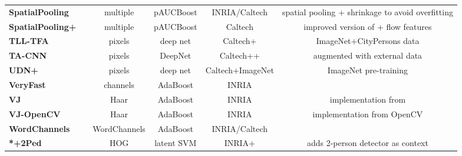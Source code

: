 \documentclass[onecolumn]{article}
\begin{document}
\begin{table}[!h]
\begin{tabular}{@{}l@{\cp}c|c@{\cp}c@{\cp}c|c@{}}
  \textbf{SpatialPooling} & \cite{PaisitkriangkraiECCV14} & multiple & pAUCBoost & INRIA/Caltech &
   spatial pooling + shrinkage to avoid overfitting\\
  \textbf{SpatialPooling+} & \cite{PaisitkriangkraiArXiv14} & multiple & pAUCBoost & Caltech &
   improved version of \cite{PaisitkriangkraiICCV13,PaisitkriangkraiECCV14} + flow features\\
  \textbf{TLL-TFA} & \cite{SongECCV18} & pixels & deep net & Caltech+ &
   ImageNet+CityPersons data \\
  \textbf{TA-CNN} & \cite{TianCVPR2015} & pixels & DeepNet & Caltech++ & 
   augmented with external data\\
  \textbf{UDN+} & \cite{OuyangPAMI17} & pixels & deep net & Caltech+ImageNet & ImageNet pre-training \\
  \textbf{VeryFast} & \cite{BenensonCVPR12} & channels & AdaBoost & INRIA & \\
  \textbf{VJ} & \cite{ViolaIJCV04} & Haar & AdaBoost & INRIA &
   implementation from \cite{WojekDAGM08}\\
  \textbf{VJ-OpenCV} & \cite{ViolaIJCV04} & Haar & AdaBoost & INRIA &
   implementation from OpenCV\\
  \textbf{WordChannels} & \cite{CosteaCVPR14} & WordChannels & AdaBoost & INRIA/Caltech & \\
  \textbf{*+2Ped} & \cite{OuyangCVPR13a} & HOG & latent SVM & INRIA+ &
   adds 2-person detector as context \\
\end{tabular}\end{table}

\end{document}
